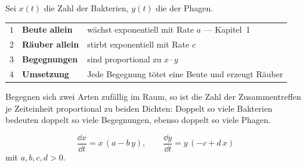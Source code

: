 \begin{merksatz}
Sei $x(t)$ die Zahl der Bakterien, $y(t)$ die der Phagen.

\begin{center}
{\small
\renewcommand{\arraystretch}{1.55}
\begin{tabular}{@{}P{0.7cm}P{3.0cm}P{4.6cm}@{}}
\toprule
$1$ & \textbf{Beute allein} & wächst exponentiell mit Rate $a$ --- Kapitel~1\\
$2$ & \textbf{Räuber allein} & stirbt exponentiell mit Rate $c$\\
$3$ & \textbf{Begegnungen} & sind proportional zu $x\cdot y$\\
$4$ & \textbf{Umsetzung} & Jede Begegnung tötet eine Beute und erzeugt Räuber\\
\bottomrule
\end{tabular}}
\end{center}

Begegnen sich zwei Arten zufällig im Raum, so ist die Zahl der Zusammentreffen je Zeiteinheit proportional zu beiden Dichten: Doppelt so viele Bakterien bedeuten doppelt so viele Begegnungen, ebenso doppelt so viele Phagen.

\begin{center}
\begin{minipage}{0.88\textwidth}
\end{minipage}
\end{center}
\end{merksatz}

\begin{definition}
\[ \frac{\dd x}{\dd t} = x\,(a - b\,y), \qquad \frac{\dd y}{\dd t} = y\,(-c + d\,x) \]
mit $a, b, c, d > 0$.
\end{definition}

